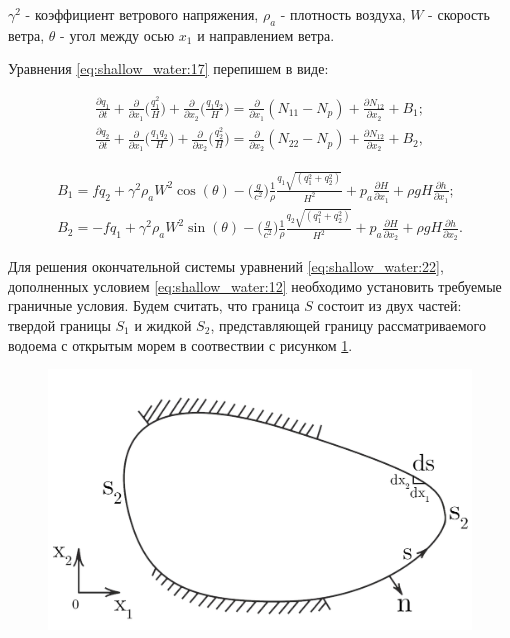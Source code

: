 \documentclass[14pt]{extreport}
\begin{document}
 $\gamma^2$ - коэффициент ветрового напряжения, $\rho_a$ - плотность воздуха, $W$ - скорость ветра, $\theta$ - угол между осью $x_1$ и направлением ветра.

Уравнения \ref{eq:shallow_water:17} перепишем в виде:


\begin{equation}\label{eq:shallow_water:22}
\begin{aligned}
\frac{\partial q_1}{\partial t} + \frac{\partial}{\partial x_1} \bigg(\frac{q_1^2}{H}\bigg)+\frac{\partial }{\partial x_2}\bigg(\frac{q_1 q_2}{H}\bigg) = \frac{\partial}{\partial x_1} (N_{11}-N_p) + \frac{\partial N_{12}}{\partial x_2} + B_1; \\
\frac{\partial q_2}{\partial t} + \frac{\partial}{\partial x_1} \bigg(\frac{q_1 q_2}{H}\bigg)+\frac{\partial }{\partial x_2}\bigg(\frac{q_2^2}{H}\bigg) = \frac{\partial}{\partial x_2} (N_{22}-N_p) + \frac{\partial N_{12}}{\partial x_2} + B_2,
\end{aligned}
\end{equation}


\begin{equation}\label{eq:shallow_water:23}
\begin{aligned}
B_1=fq_2+\gamma^2\rho_aW^2\cos(\theta)-\bigg(\frac{g}{c^2}\bigg)\frac{1}{\rho}\frac{q_1\sqrt{(q_1^2+q_2^2)}}{H^2} + p_a \frac{\partial H}{\partial x_1} + \rho gH\frac{\partial h}{\partial x_1}; \\
B_2=-fq_1+\gamma^2\rho_aW^2\sin(\theta)-\bigg(\frac{g}{c^2}\bigg)\frac{1}{\rho}\frac{q_2\sqrt{(q_1^2+q_2^2)}}{H^2} + p_a \frac{\partial H}{\partial x_2} + \rho gH\frac{\partial h}{\partial x_2}.
\end{aligned}
\end{equation}

Для решения окончательной системы уравнений \ref{eq:shallow_water:22}, дополненных условием \ref{eq:shallow_water:12} необходимо установить требуемые граничные условия. Будем считать, что граница $S$ состоит из двух частей: твердой границы $S_1$ и жидкой $S_2$, представляющей границу рассматриваемого водоема с открытым морем в соотвествии с рисунком \ref{img:shallow_water:3}.

\begin{figure}[H]
\centerline{\includegraphics[width=0.5\linewidth]{images/shallow_water_3}}
\caption{}
\label{img:shallow_water:3}
\end{figure}
\end{document}
